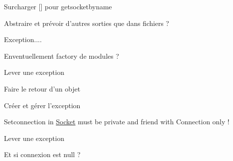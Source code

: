 
\begin{DoxyRefList}
\item[\label{todo__todo000002}%
\hypertarget{todo__todo000002}{}%
Membre \hyperlink{classBatteryModule_a2fb494ef5f124c38c0fdf9ccfb31918f}{Battery\-Module\-:\-:Battery\-Module} (std\-::string name, Params params=Params())]Surcharger \mbox{[}\mbox{]} pour getsocketbyname  
\item[\label{todo__todo000004}%
\hypertarget{todo__todo000004}{}%
Membre \hyperlink{classHCIs_afeb0ee7efd2c14dfded566aacb9dc615}{H\-C\-Is\-:\-:add\-Data\-Output} (std\-::string, std\-::string)]Abstraire et prévoir d'autres sorties que dans fichiers ?  
\item[\label{todo__todo000005}%
\hypertarget{todo__todo000005}{}%
Membre \hyperlink{classHCIs_a15b2703edaaf748e452e9d4df4262465}{H\-C\-Is\-:\-:get\-Data\-Output} (std\-::string)]Exception....  
\item[\label{todo__todo000006}%
\hypertarget{todo__todo000006}{}%
Classe \hyperlink{classISynchronized}{I\-Synchronized} ]Enventuellement factory de modules ?  
\item[\label{todo__todo000007}%
\hypertarget{todo__todo000007}{}%
Membre \hyperlink{classModule_ab7ea9648fa500696c85e93ebd0666390}{Module\-:\-:clock} (int)]Lever une exception  
\item[\label{todo__todo000008}%
\hypertarget{todo__todo000008}{}%
Membre \hyperlink{classModule_aed844ffed911793d3895c5a2bc4f9d43}{Module\-:\-:get\-Socket\-By\-Name} (std\-::string)]Faire le retour d'un objet 

Créer et gérer l'exception  
\item[\label{todo__todo000013}%
\hypertarget{todo__todo000013}{}%
Classe \hyperlink{classSocket}{Socket} ]Setconnection in \hyperlink{classSocket}{Socket} must be private and friend with Connection only !  
\item[\label{todo__todo000012}%
\hypertarget{todo__todo000012}{}%
Membre \hyperlink{classSocket_a71e162a0ca00b1a46fe23eaccb09f76d}{Socket\-:\-:get\-First\-Message} ()]Lever une exception  
\item[\label{todo__todo000011}%
\hypertarget{todo__todo000011}{}%
Membre \hyperlink{classSocket_a06b687baf9b01f3e399a5ee040ca04e4}{Socket\-:\-:send} (std\-::shared\-\_\-ptr$<$ Message $>$)]Et si connexion est null ? 
\end{DoxyRefList}